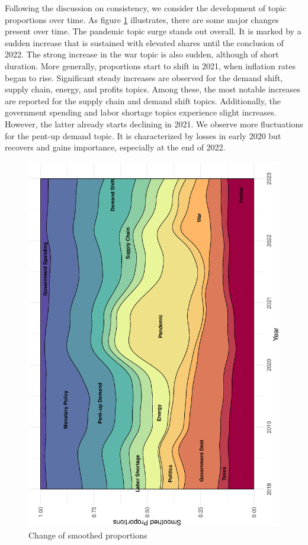 Following the discussion on consistency, we consider the development of topic proportions over time. As figure \ref{fig:narr_all} illustrates, there are some major changes present over time. The pandemic topic surge stands out overall. It is marked by a sudden increase that is sustained with elevated shares until the conclusion of 2022. The strong increase in the war topic is also sudden, although of short duration. More generally, proportions start to shift in 2021, when inflation rates began to rise. Significant steady increases are observed for the demand shift, supply chain, energy, and profits topics. Among these, the most notable increases are reported for the supply chain and demand shift topics. Additionally, the government spending and labor shortage topics experience slight increases. However, the latter already starts declining in 2021. We observe more fluctuations for the pent-up demand topic. It is characterized by losses in early 2020 but recovers and gains importance, especially at the end of 2022.

\begin{figure}[H]
	\centering
	\includegraphics[width=0.65\linewidth, angle = 270]{figures/narratives_all.eps}
	\caption{Change of smoothed proportions}
	\label{fig:narr_all}
\end{figure}

